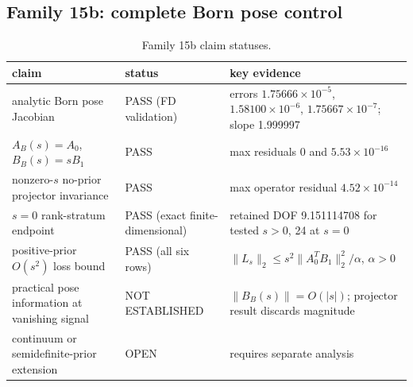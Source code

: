 \documentclass[12pt]{article}
\begin{document}
\subsection{Family 15b: complete Born pose control}
\begin{table}[ht]
\centering
\small
\caption{Family 15b claim statuses.}
\label{app:tab:f15b}
\begin{tabular}{p{} p{} p{}}
\toprule
claim & status & key evidence \\
\midrule
analytic Born pose Jacobian & PASS (FD validation) &
errors $1.75666\times10^{-5}$, $1.58100\times10^{-6}$,
$1.75667\times10^{-7}$; slope 1.999997 \\
$A_B(s)=A_0$, $B_B(s)=sB_1$ & PASS &
max residuals 0 and $5.53\times10^{-16}$ \\
nonzero-$s$ no-prior projector invariance & PASS &
max operator residual $4.52\times10^{-14}$ \\
$s=0$ rank-stratum endpoint & PASS (exact finite-dimensional) &
retained DOF 9.151114708 for tested $s>0$, 24 at $s=0$ \\
positive-prior $O(s^2)$ loss bound & PASS (all six rows) &
$\|L_s\|_2\le s^2\|A_0^TB_1\|_2^2/\alpha$, $\alpha>0$ \\
practical pose information at vanishing signal & NOT ESTABLISHED &
$\|B_B(s)\|=O(|s|)$; projector result discards magnitude \\
continuum or semidefinite-prior extension & OPEN &
requires separate analysis \\
\bottomrule
\end{tabular}
\end{table}
\end{document}
